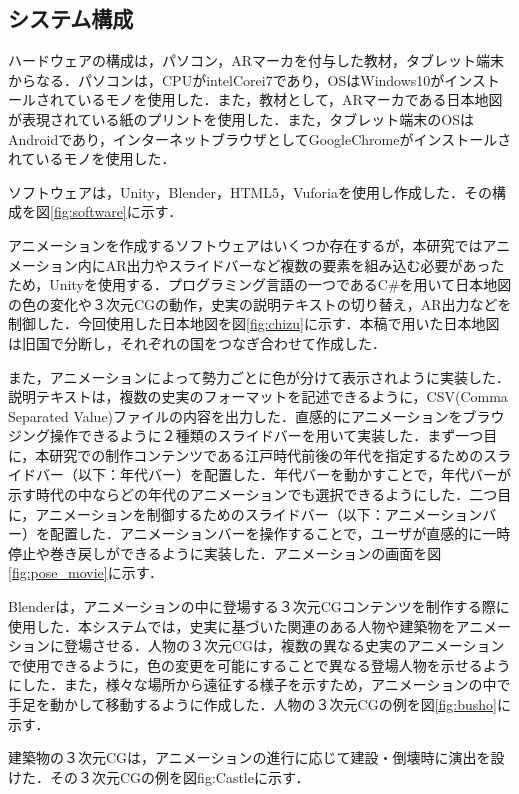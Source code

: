 \documentclass[a4paper,dvipdfmx]{hisken}
\begin{document}
\subsection{システム構成}

ハードウェアの構成は，パソコン，ARマーカを付与した教材，タブレット端末からなる．パソコンは，CPUがintelCorei7であり，OSはWindows10がインストールされているモノを使用した．また，教材として，ARマーカである日本地図が表現されている紙のプリントを使用した．また，タブレット端末のOSはAndroidであり，インターネットブラウザとしてGoogleChromeがインストールされているモノを使用した．

ソフトウェアは，Unity，Blender，HTML5，Vuforiaを使用し作成した．その構成を図\ref{fig:software}に示す．

アニメーションを作成するソフトウェアはいくつか存在するが，本研究ではアニメーション内にAR出力やスライドバーなど複数の要素を組み込む必要があったため，Unityを使用する．プログラミング言語の一つであるC\#を用いて日本地図の色の変化や３次元CGの動作，史実の説明テキストの切り替え，AR出力などを制御した．今回使用した日本地図を図\ref{fig:chizu}に示す．本稿で用いた日本地図は旧国で分断し，それぞれの国をつなぎ合わせて作成した．

また，アニメーションによって勢力ごとに色が分けて表示されように実装した．説明テキストは，複数の史実のフォーマットを記述できるように，CSV(Comma Separated Value)ファイルの内容を出力した．直感的にアニメーションをブラウジング操作できるように２種類のスライドバーを用いて実装した．まず一つ目に，本研究での制作コンテンツである江戸時代前後の年代を指定するためのスライドバー（以下：年代バー）を配置した．年代バーを動かすことで，年代バーが示す時代の中ならどの年代のアニメーションでも選択できるようにした．二つ目に，アニメーションを制御するためのスライドバー（以下：アニメーションバー）を配置した．アニメーションバーを操作することで，ユーザが直感的に一時停止や巻き戻しができるように実装した．アニメーションの画面を図\ref{fig:pose_movie}に示す．


Blenderは，アニメーションの中に登場する３次元CGコンテンツを制作する際に使用した．本システムでは，史実に基づいた関連のある人物や建築物をアニメーションに登場させる．人物の３次元CGは，複数の異なる史実のアニメーションで使用できるように，色の変更を可能にすることで異なる登場人物を示せるようにした．また，様々な場所から遠征する様子を示すため，アニメーションの中で手足を動かして移動するように作成した．人物の３次元CGの例を図\ref{fig:busho}に示す．

建築物の３次元CGは，アニメーションの進行に応じて建設・倒壊時に演出を設けた．その３次元CGの例を図{fig:Castle}に示す．
\end{document}
